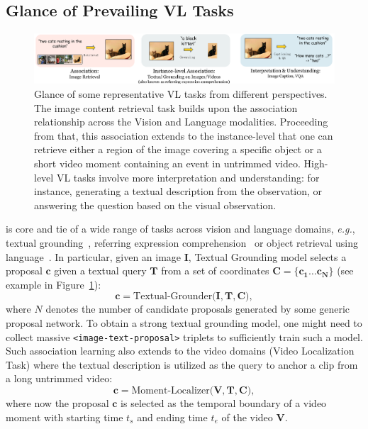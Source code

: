 \subsection{Glance of Prevailing VL Tasks}


\begin{figure}
\begin{center}
\includegraphics[width=.99\textwidth]{images/VL-tasks.pdf}
\end{center}
\caption[Prevailing VL Tasks.]{Glance of some representative VL tasks from different perspectives. The image content retrieval task builds upon the association relationship across the Vision and Language modalities. Proceeding from that, this association extends to the instance-level that one can retrieve either a region of the image covering a specific object or a short video moment containing an event in untrimmed video. High-level VL tasks involve more interpretation and understanding: for instance, generating a textual description from the observation, or answering the question based on the visual observation.}
\label{fig:VLtasks}
\end{figure}

 is core and tie of a wide range of tasks across vision and language domains, \emph{e.g.}, textual grounding~\citep{plummer2015flickr30k}, referring expression comprehension~\citep{nagaraja2016modeling} or object retrieval using language~\citep{hu2016natural}. In particular, given an image $\mathbf{I}$, {T}extual {G}rounding model selects a proposal $\mathbf{c}$ given a textual query $\mathbf{T}$ from a set of coordinates $\mathbf{C} = \{\mathbf{c_1 \dots c_N}\}$ (see example in Figure~\ref{fig:VLtasks}):
\begin{equation}
    \mathbf{c} = \text{Textual-Grounder}{\big(}\mathbf{I}, \mathbf{T},\mathbf{C}{\big)},
\end{equation}
where $N$ denotes the number of candidate proposals generated by some generic proposal network. To obtain a strong textual grounding model, one might need to collect massive \texttt{<image-text-proposal>} triplets to sufficiently train such a model. 
Such association learning also extends to the video domains ({V}ideo {L}ocalization Task) where the textual description is utilized as the query to anchor a clip from a long untrimmed video:
\begin{equation}
    \mathbf{c} = \text{Moment-Localizer}{\big(}\mathbf{V}, \mathbf{T}, \mathbf{C}{\big)},
\end{equation}
where now the proposal $\mathbf{c}$ is selected as the temporal boundary of a video moment with starting time $t_s$ and ending time $t_e$ of the video $\mathbf{V}$.

